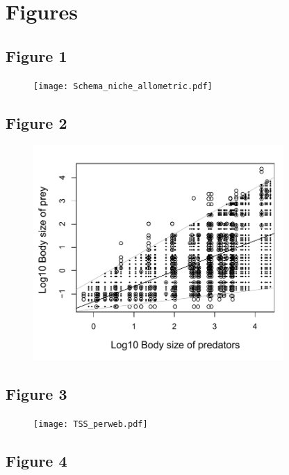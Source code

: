 \documentclass[12pt]{article}
\begin{document}
\newpage
\section*{Figures}

\subsection*{Figure 1}

\begin{figure}[ht!]
	\centering\texttt{[image: Schema\_niche\_allometric.pdf]}
\end{figure}

\newpage
\subsection*{Figure 2}

\begin{figure}[ht!]
	\centering\includegraphics[width=0.85\textwidth]{Example.pdf}
\end{figure}

\newpage
\subsection*{Figure 3}

\begin{figure}[ht!]
	\centering\texttt{[image: TSS\_perweb.pdf]}
\end{figure}

\newpage
\subsection*{Figure 4}
\end{document}
